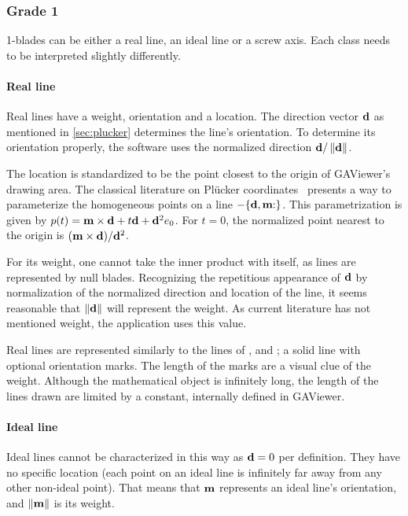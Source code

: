 \subsubsection{Grade 1}
1-blades can be either a real line, an ideal line or a screw axis.  Each class needs to be interpreted slightly differently.

\paragraph{Real line}
Real lines have a weight, orientation and a location.  The direction vector $\mathbf{d}$ as mentioned in \autoref{sec:plucker} determines the line's orientation.  To determine its orientation properly, the software uses the normalized direction $\mathbf{d} / \left\|\mathbf{d}\right\|$.

The location is standardized to be the point closest to the origin of GAViewer's drawing area.  The classical literature on Pl\"ucker coordinates~\cite{Shoemake} presents a way to parameterize the homogeneous points on a line $-\plucker{\V{d}, \V{m}}$.  This parametrization is given by $p(t) = \mathbf{m} \times \mathbf{d} + t \mathbf{d} + \mathbf{d}^2e_0$.  For $t = 0$, the normalized point nearest to the origin is $(\mathbf{m} \times \mathbf{d}) / \mathbf{d}^2$.

For its weight, one cannot take the inner product with itself, as lines are represented by null blades.  Recognizing the repetitious appearance of $\mathbf{d}$ by normalization of the normalized direction and location of the line, it seems reasonable that $\left\|\mathbf{d}\right\|$ will represent the weight.  As current literature has not mentioned weight, the application uses this value.

Real lines are represented similarly to the lines of \pga{}, \cga{} and \cbga{}; a solid line with optional orientation marks.  The length of the marks are a visual clue of the weight.  Although the mathematical object is infinitely long, the length of the lines drawn are limited by a constant, internally defined in GAViewer.

\paragraph{Ideal line}
Ideal lines cannot be characterized in this way as $\mathbf{d} = 0$ per definition.  They have no specific location (each point on an ideal line is infinitely far away from any other non-ideal point).  That means that $\mathbf{m}$ represents an ideal line's orientation, and $\left\|\mathbf{m}\right\|$ is its weight.

